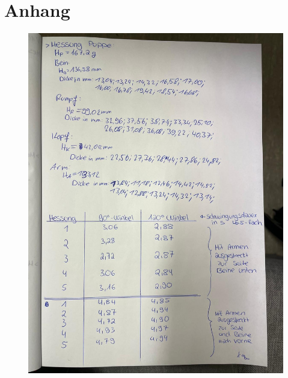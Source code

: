 \section*{Anhang}
\label{sec:Anhang}

\begin{figure}
    \centering
    \includegraphics[width=\textwidth]{messdaten_bilder/Daten1.jpg}
\end{figure}

